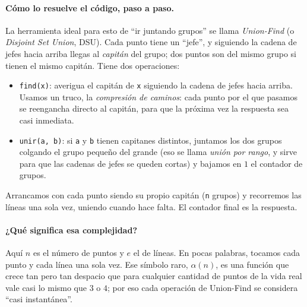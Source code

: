 \paragraph{Cómo lo resuelve el código, paso a paso.} La herramienta ideal para
esto de ``ir juntando grupos'' se llama \emph{Union-Find} (o \emph{Disjoint Set
Union}, DSU). Cada punto tiene un ``jefe'', y siguiendo la cadena de jefes hacia
arriba llegas al \emph{capitán} del grupo; dos puntos son del mismo grupo si
tienen el mismo capitán. Tiene dos operaciones:
\begin{itemize}
\item \texttt{find(x)}: averigua el capitán de \texttt{x} siguiendo la cadena de
  jefes hacia arriba. Usamos un truco, la \emph{compresión de caminos}: cada
  punto por el que pasamos se reengancha directo al capitán, para que la próxima
  vez la respuesta sea casi inmediata.
\item \texttt{unir(a, b)}: si \texttt{a} y \texttt{b} tienen capitanes distintos,
  juntamos los dos grupos colgando el grupo pequeño del grande (eso se llama
  \emph{unión por rango}, y sirve para que las cadenas de jefes se queden cortas)
  y bajamos en $1$ el contador de grupos.
\end{itemize}
Arrancamos con cada punto siendo su propio capitán (\texttt{n} grupos) y
recorremos las líneas una sola vez, uniendo cuando hace falta. El contador final
es la respuesta.




\paragraph{¿Qué significa esa complejidad?} Aquí $n$ es el número de puntos y
$e$ el de líneas. En pocas palabras, tocamos cada punto y cada línea una sola
vez. Ese símbolo raro, $\alpha(n)$, es una función que crece tan pero tan
despacio que para cualquier cantidad de puntos de la vida real vale casi lo
mismo que $3$ o $4$; por eso cada operación de Union-Find se considera ``casi
instantánea''.

